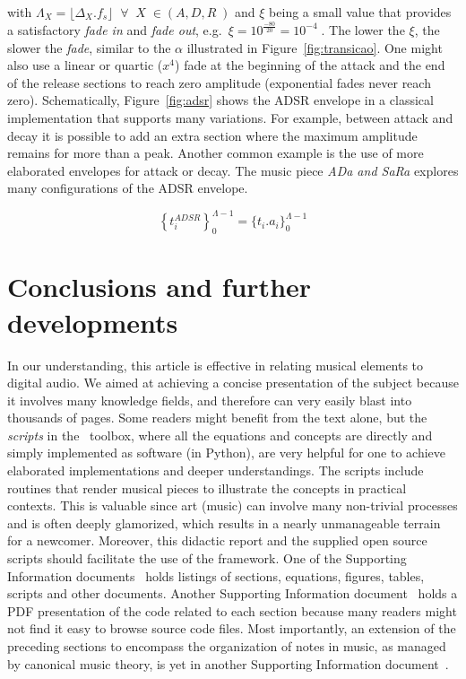 \noindent with $\Lambda_X=\lfloor \Delta_X . f_s \rfloor\;\;\forall\;\; X \; \in
(A,D,R\;)$ and $\xi$ being a small value that provides a satisfactory \emph{fade in} and \emph{fade out}, e.g.\ $\xi=10^{\frac{-80}{20}}=10^{-4}\;$.
The lower the $\xi$, the slower the \emph{fade}, similar to the $\alpha$ illustrated in Figure~\ref{fig:transicao}.
One might also use a linear or quartic ($x^4$) fade at the beginning of the attack and the end of the release
sections to reach zero amplitude (exponential fades never reach zero).
Schematically, Figure~\ref{fig:adsr} shows the ADSR envelope in a classical implementation that supports many variations.
For example, between attack and decay it is possible to add an extra section where the maximum amplitude remains for more than a peak.
Another common example is the use of more elaborated envelopes for attack or decay.
The music piece \emph{ADa and SaRa} explores many configurations of the ADSR envelope.~\cite{MASSA}

\begin{equation}\label{eq:adsrApl}
\left\{t_i^{ADSR}\right\}_0^{\Lambda-1} =\{t_i . a_i\}_0^{\Lambda-1}
\end{equation}

\section{Conclusions and further developments}
\label{cap:conclusao}
In our understanding,
this article is effective in relating musical elements to digital audio.
We aimed at achieving a concise presentation of the subject because it involves many knowledge fields, and therefore can very easily blast into thousands of pages.
Some readers might benefit from the text alone, but the \emph{scripts} in the \massa\ toolbox, where all the equations and concepts are directly and simply implemented as software (in Python),
are very helpful for one to achieve elaborated implementations and deeper understandings.
The scripts include routines that render musical pieces to illustrate the concepts in practical contexts.
This is valuable since art (music) can involve many non-trivial processes and is often deeply glamorized, which results in a nearly unmanageable terrain for a newcomer.
Moreover, this didactic report and the supplied open source scripts should facilitate the use of the framework.
One of the Supporting Information documents~\cite{massListings} holds listings of sections, equations, figures, tables, scripts and other documents.
Another Supporting Information document~\cite{massCode} holds a PDF presentation of the code related to each section
because many readers might not find it easy to browse source code files.
Most importantly, an extension of the preceding sections to encompass the organization of notes in music, as managed by canonical music theory, is yet in another Supporting Information document~\cite{massNotesInMusic}.


